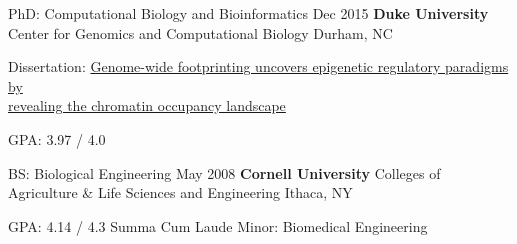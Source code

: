
\begin{resentries}

  \resentry
	{PhD: Computational Biology and Bioinformatics}
	{Dec 2015}
	{\textbf{Duke University} \xspace \bullet \xspace \xspace Center for Genomics and Computational Biology}
	{Durham, NC}
    {
      \begin{hangitems} %
		\item{Dissertation: \href{https://dukespace.lib.duke.edu/dspace/handle/10161/11371}{\color{blue} Genome-wide footprinting uncovers epigenetic regulatory paradigms by\\ revealing the chromatin occupancy landscape}}
		\item{GPA: 3.97 / 4.0}
      \end{hangitems}
    }

  \resentry
	{BS: Biological Engineering}
	{May 2008}
	{\textbf{Cornell University} \xspace \bullet \xspace \xspace Colleges of Agriculture \& Life Sciences and Engineering}
	{Ithaca, NY}
    {
      \begin{cvitems} %
		\item {GPA: 4.14 / 4.3 \xspace \bullet \xspace \xspace Summa Cum Laude \xspace \bullet \xspace \xspace Minor: Biomedical Engineering}
      \end{cvitems}
    }
\end{resentries}

\vspace{-2mm}
